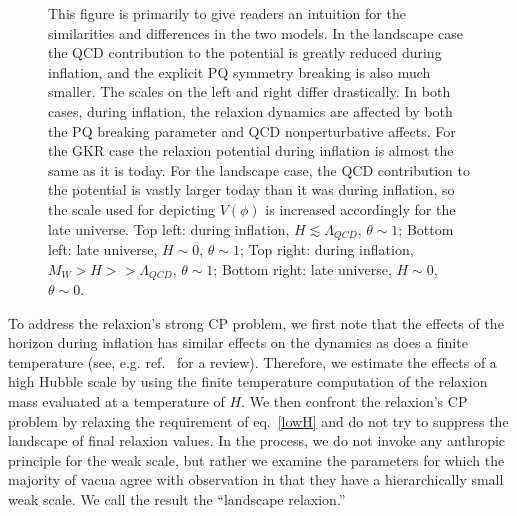 \documentclass[12pt,aps,prd,showpacs,notitlepage,nofootinbib]{revtex4-1}
\begin{document}
\begin{figure}[ht]
\centering
{}
\quad
{}
%
\caption{\small \baselineskip 11pt
This figure is primarily to give readers an intuition for the similarities and differences in the two models. In the landscape case the QCD contribution to the potential is greatly reduced during inflation, and the explicit PQ symmetry breaking is also much smaller. The scales on the left and right differ drastically. In both cases, during inflation,  the relaxion dynamics are affected by both the PQ breaking parameter and QCD nonperturbative affects. For the GKR case the relaxion potential during inflation is almost the same as it is today.  For the landscape case,  the QCD contribution to the potential  is vastly larger  today  than it was during inflation, so the scale used for depicting $V(\phi)$ is increased accordingly for the late universe. Top left: during inflation, $H \lesssim \Lambda_{QCD}$, $\theta \sim1$; Bottom left: late universe, $H \sim 0$, $\theta \sim 1$; Top right: during inflation, $M_{W} > H >> \Lambda_{QCD}$, $\theta \sim 1$; Bottom right: late universe, $H  \sim 0$, $\theta \sim 0$.   }
\label{fig:figure}
\end{figure}


To address the relaxion's strong CP problem, we first note that the effects of the horizon during inflation has similar effects on the dynamics as does a finite temperature (see, e.g. ref.~\cite{Spradlin:2001pw} for a review). Therefore, we estimate the effects of a high Hubble scale by using the finite temperature computation of the relaxion mass evaluated at a temperature of $H$. We then confront the relaxion's CP problem by relaxing the requirement of eq.~\ref{lowH} and do not try to suppress the landscape of final relaxion values. In the process, we do not invoke any anthropic principle for the weak scale, but rather we examine the parameters for which the majority of vacua agree with observation in that they have a hierarchically small weak scale. We call the result the ``landscape relaxion.''
 
\end{document}
